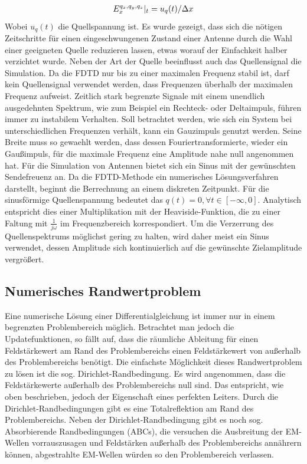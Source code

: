 \documentclass[11pt, ngerman]{article}
\begin{document}
\begin{align}
	\Ef{x}{q_x,q_y, q_z}{0} = u_q(t)/\Delta x
\end{align}
Wobei \(u_q(t)\) die Quellspannung ist. Es wurde gezeigt, dass sich die n\"otigen Zeitschritte f\"ur einen
eingeschwungenen Zustand einer Antenne durch die Wahl einer geeigneten Quelle reduzieren lassen\cite{advanced_gap_feed},
etwas worauf der Einfachkeit halber verzichtet wurde. Neben der Art der Quelle beeinflusst auch das Quellensignal die
Simulation. Da die FDTD nur bis zu einer maximalen Frequenz stabil ist, darf kein Quellensignal verwendet werden, dass
Frequenzen \"uberhalb der maximalen Frequenz aufweist. Zeitlich stark begrenzte Signale mit einem unendlich ausgedehnten
Spektrum, wie zum Beispiel ein Rechteck- oder Deltaimpuls, f\"uhren immer zu instabilem Verhalten. Soll betrachtet werden,
wie sich ein System bei unterschiedlichen Frequenzen verh\"alt, kann ein Gauzimpuls genutzt werden.
Seine Breite muss so gewaehlt werden, dass dessen Fouriertransformierte,
wieder ein Gau{\ss}impuls, f\"ur die maximale Frequenz eine Amplitude nahe null angenommen hat.
F\"ur die Simulation von Antennen bietet sich ein Sinus mit der gew\"unschten Sendefreuenz an. Da die FDTD-Methode ein
numerisches L\"osungsverfahren darstellt, beginnt die Berrechnung an einem diskreten Zeitpunkt. F\"ur die
sinusf\"ormige Quellenspannung bedeutet das \(q(t) = 0, \forall t \in [-\infty, 0]\).
Analytisch entspricht dies einer Multiplikation mit der Heaviside-Funktion, die zu einer Faltung mit
\(\frac{1}{j\omega}\) im Frequenzbereich korrespondiert. Um die Verzerrung des Quellenspektrums m\"oglichst gering zu halten, wird daher
meist ein Sinus verwendet, dessen Amplitude sich kontinuierlich auf die gew\"unschte Zielamplitude vergr\"o{\ss}ert\cite{ramped_sin}.


\subsection{Numerisches Randwertproblem}
Eine numerische L\"osung einer Differentialgleichung ist immer nur in einem begrenzten Problembereich m\"oglich.
Betrachtet man jedoch die Updatefunktionen, so f\"allt auf, dass die r\"aumliche Ableitung f\"ur einen Feldst\"arkewert
am Rand des Problembereichs einen Feldst\"arkewert von au{\ss}erhalb des Problembereichs ben\"otigt.
Die einfachste M\"oglichkeit dieses Randwertproblem zu l\"osen ist die sog. Dirichlet-Randbedingung.
Es wird angenommen, dass die Feldst\"arkewerte au{\ss}erhalb des Problembereichs null sind\cite{dirichlet_nbc}.
Das entspricht, wie oben beschrieben, jedoch der Eigenschaft eines perfekten Leiters. Durch die Dirichlet-Randbedingungen
gibt es eine Totalreflektion am Rand des Problembereichs.
Neben der Dirichlet-Randbedingung gibt es noch sog. Absorbierende Randbedingungen (ABCs), die versuchen
die Ausbreitung der EM-Wellen vorrauszusagen und Feldst\"arken au{\ss}erhalb des Problembereichs ann\"ahrern k\"onnen,
abgestrahlte EM-Wellen w\"urden so den Problembereich verlassen.
\end{document}
